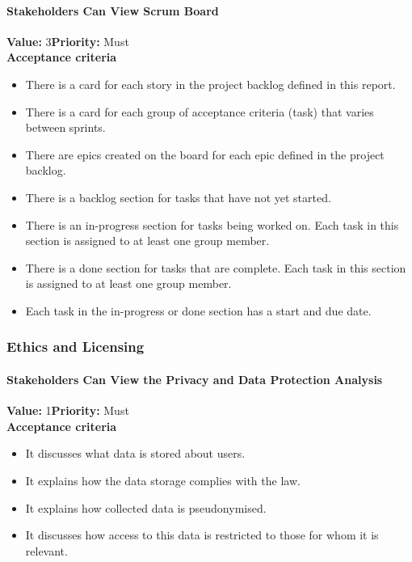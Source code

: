 \paragraph{Stakeholders Can View Scrum Board}
\textbf{Value:} 3\quad \textbf{Priority:} Must\\
\textbf{Acceptance criteria}
\begin{itemize}
  \item There is a card for each story in the project backlog defined in this report.
  \item There is a card for each group of acceptance criteria (task) that varies between sprints.
  \item There are epics created on the board for each epic defined in the project backlog.
  \item There is a backlog section for tasks that have not yet started.
  \item There is an in-progress section for tasks being worked on. Each task in this section is assigned to at least one group member.
  \item There is a done section for tasks that are complete. Each task in this section is assigned to at least one group member.
  \item Each task in the in-progress or done section has a start and due date.
\end{itemize}

\subsubsection{Ethics and Licensing}

\paragraph{Stakeholders Can View the Privacy and Data Protection Analysis}
\textbf{Value:} 1\quad \textbf{Priority:} Must\\
\textbf{Acceptance criteria}
\begin{itemize}
  \item It discusses what data is stored about users.
  \item It explains how the data storage complies with the law.
  \item It explains how collected data is pseudonymised.
  \item It discusses how access to this data is restricted to those for whom it is relevant.
\end{itemize}

